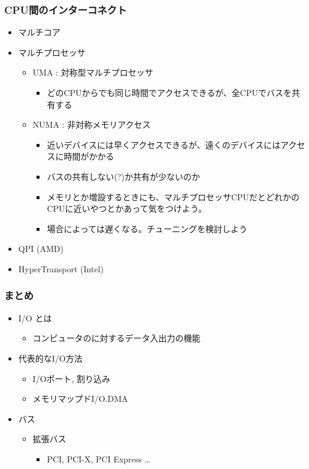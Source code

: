 \documentclass{jsarticle}
\begin{document}
\subsubsection{CPU間のインターコネクト}

\begin{itemize}
\item
  マルチコア
\item
  マルチプロセッサ
  \begin{itemize}
  \item
    UMA : 対称型マルチプロセッサ
    \begin{itemize}
    \item
      どのCPUからでも同じ時間でアクセスできるが、全CPUでバスを共有する
    \end{itemize}
  \item
    NUMA : 非対称メモリアクセス
    \begin{itemize}
    \item
      近いデバイスには早くアクセスできるが、遠くのデバイスにはアクセスに時間がかかる
    \item
      バスの共有しない(?)か共有が少ないのか
    \item
      メモリとか増設するときにも、マルチプロセッサCPUだとどれかのCPUに近いやつとかあって気をつけよう。
    \item
      場合によっては遅くなる。チューニングを検討しよう
    \end{itemize}
  \end{itemize}
\item
  QPI (AMD)
\item
  HyperTransport (Intel)
\end{itemize}
\subsubsection{まとめ}

\begin{itemize}
\item
  I/O とは
  \begin{itemize}
  \item
    コンピュータのに対するデータ入出力の機能
  \end{itemize}
\item
  代表的なI/O方法
  \begin{itemize}
  \item
    I/Oポート, 割り込み
  \item
    メモリマップドI/O.DMA
  \end{itemize}
\item
  バス
  \begin{itemize}
  \item
    拡張バス
    \begin{itemize}
    \item
      PCI, PCI-X, PCI Express \ldots{}
    \end{itemize}
  \end{itemize}
\end{itemize}
\end{document}
